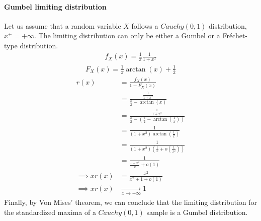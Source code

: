 \paragraph{Gumbel limiting distribution}
Let us assume that a random variable $X$ follows a $Cauchy(0,1)$ distribution, $x^+ = + \infty$. The limiting distribution can only be either a Gumbel or a Fréchet-type distribution.
\begin{equation}
\begin{alignat*}{2}
f_X(x) = \frac{1}{\pi} \frac{1}{1 + x^2}
\end{alignat*}
\end{equation}
\begin{equation}
\begin{alignat*}{2}
F_X(x) = \frac{1}{\pi} \arctan(x) + \frac{1}{2}
\end{alignat*}
\end{equation}
\begin{equation}
\begin{alignat*}{2}
r(x) &= \frac{f_X(x)}{1 - F_X(x)} \\
&= \frac{\frac{1}{1 + x^2}}{\frac{\pi}{2} - \arctan(x)} \\
&= \frac{\frac{1}{1 + x^2}}{\frac{\pi}{2} - (\frac{\pi}{2} - \arctan(\frac{1}{x}))}\\
&= \frac{1}{(1 + x^2) \arctan(\frac{1}{x})}\\
&= \frac{1}{(1 + x^2) (\frac{1}{x} + o(\frac{1}{x^2}))}\\
&= \frac{1}{\frac{1 + x^2}{x} + o(1)}\\
\implies x r(x) &= \frac{x^2}{x^2 + 1 + o(1)} \\
\implies x r(x) &\xrightarrow[x \rightarrow + \infty]{} 1
\end{alignat*}
\end{equation}
Finally, by Von Mises' theorem, we can conclude that the limiting distribution for the standardized maxima of a $Cauchy(0,1)$ sample is a Gumbel distribution.
